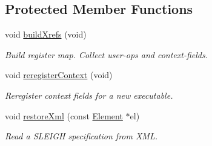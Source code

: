 \subsection*{Protected Member Functions}
\begin{DoxyCompactItemize}
\item 
void \mbox{\hyperlink{class_sleigh_base_a25a5389699beb6eeb71db527808cddf7}{build\+Xrefs}} (void)
\begin{DoxyCompactList}\small\item\em Build register map. Collect user-\/ops and context-\/fields. \end{DoxyCompactList}\item 
void \mbox{\hyperlink{class_sleigh_base_a8d6034782b1d4ada68289054d4cdf8c3}{reregister\+Context}} (void)
\begin{DoxyCompactList}\small\item\em Reregister context fields for a new executable. \end{DoxyCompactList}\item 
void \mbox{\hyperlink{class_sleigh_base_a4f2cd05135b68d2bafb549cfe87d3be5}{restore\+Xml}} (const \mbox{\hyperlink{class_element}{Element}} $\ast$el)
\begin{DoxyCompactList}\small\item\em Read a S\+L\+E\+I\+GH specification from X\+ML. \end{DoxyCompactList}\end{DoxyCompactItemize}
